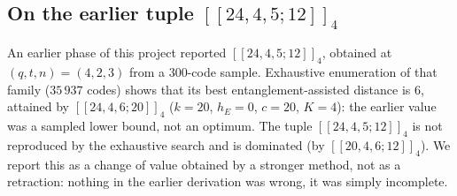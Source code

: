 \subsection{On the earlier tuple \texorpdfstring{$[[24,4,5;12]]_4$}{[[24,4,5;12]]\_4}}

An earlier phase of this project reported $[[24,4,5;12]]_4$, obtained at
$(q,t,n)=(4,2,3)$ from a $300$-code sample. Exhaustive enumeration of that
family ($35\,937$ codes) shows that its best entanglement-assisted distance is
$6$, attained by $[[24,4,6;20]]_4$ ($k=20$, $h_E=0$, $c=20$, $K=4$): the
earlier value was a sampled lower bound, not an optimum. The tuple
$[[24,4,5;12]]_4$ is not reproduced by the exhaustive search and is dominated
(by $[[20,4,6;12]]_4$). We report this as a change of value obtained by a
stronger method, not as a retraction: nothing in the earlier derivation was
wrong, it was simply incomplete.
